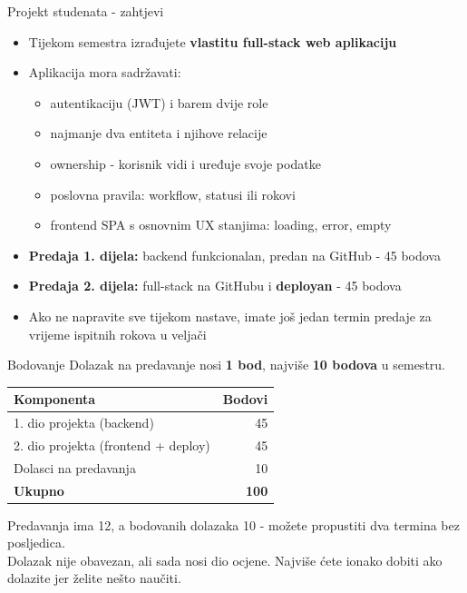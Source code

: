 \begin{frame}{Projekt studenata - zahtjevi}
	\begin{itemize}
		\item Tijekom semestra izrađujete \textbf{vlastitu full-stack web aplikaciju}
		\item Aplikacija mora sadržavati:
		\begin{itemize}
			\item autentikaciju (JWT) i barem dvije role
			\item najmanje dva entiteta i njihove relacije
			\item ownership - korisnik vidi i uređuje svoje podatke
			\item poslovna pravila: workflow, statusi ili rokovi
			\item frontend SPA s osnovnim UX stanjima: loading, error, empty
		\end{itemize}
		\item \textbf{Predaja 1. dijela:} backend funkcionalan, predan na GitHub - 45 bodova
		\item \textbf{Predaja 2. dijela:} full-stack na GitHubu i \textbf{deployan} - 45 bodova
		\item Ako ne napravite sve tijekom nastave, imate još jedan termin predaje za vrijeme ispitnih rokova u veljači
	\end{itemize}
\end{frame}

\begin{frame}{Bodovanje}
Dolazak na predavanje nosi \textbf{1 bod}, najviše \textbf{10 bodova} u semestru.

\vspace{0.6em}
\begin{tabular}{@{}lr@{}}
  \toprule
  \textbf{Komponenta} & \textbf{Bodovi} \\
  \midrule
  1. dio projekta (backend) & 45 \\
  2. dio projekta (frontend + deploy) & 45 \\
  Dolasci na predavanja & 10 \\
  \midrule
  \textbf{Ukupno} & \textbf{100} \\
  \bottomrule
\end{tabular}

\vspace{0.6em}
Predavanja ima 12, a bodovanih dolazaka 10 - možete propustiti dva termina bez posljedica. \\
Dolazak nije obavezan, ali sada nosi dio ocjene. Najviše ćete ionako dobiti ako dolazite jer želite nešto naučiti.
\end{frame}

